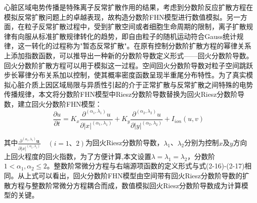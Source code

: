 \documentclass[twoside,UTF8]{nputhesis}
\begin{document}
心脏区域电势传播是特殊离子反常扩散作用的结果，考虑到分数阶反应扩散方程在模拟反常扩散问题上的卓越表现，故构造分数阶FHN模型进行数值模拟。另一方面，在粒子反常扩散过程中，受到扩散空间或者细胞生命周期的限制，离子扩散规律有向服从标准扩散规律转化的趋势，即自由粒子的随机运动符合Gauss统计规律，这一转化的过程称为"暂态反常扩散"。在原有控制分数阶扩散方程的幂律关系上添加指数函数，可以推导出一种新的分数阶导数定义形式——回火分数阶导数。回火分数阶扩散方程可以用于模拟这一过程。空间回火分数阶导数对粒子空间跳跃步长幂律分布关系加以控制，使其概率密度函数呈现半重尾分布特性。为了真实模拟心脏介质上因区域局限与异质性引起的介于正常扩散与反常扩散之间特殊的电势传播规律，本文将分数阶FHN模型中Riesz分数阶导数替换为回火Riesz分数阶导数，建立回火分数阶FHN模型：
\begin{equation}
\frac{\partial u}{\partial t}={{K}_{x}}\frac{{{\partial }^{({{\alpha }_{1}},{{\lambda }_{1}})}}u}{\partial {{\left| x \right|}^{({{\alpha }_{1}},{{\lambda }_{1}})}}}+{{K}_{y}}\frac{{{\partial }^{({{\alpha }_{2}},{{\lambda }_{2}})}}u}{\partial {{\left| y \right|}^{({{\alpha }_{2}},{{\lambda }_{2}})}}}+{{I}_{ion}}(u,v)
\end{equation}

其中$\frac{{{\partial }^{({{\alpha }_{i}},{{\lambda }_{i}})}}\bm{u}}{\partial {{\left| x \right|}^{({{\alpha }_{i}},{{\lambda }_{i}})}}}\quad(i=   1\text{、}2)$为回火Riesz分数阶导数，${{\lambda }_{1}}$、${{\lambda }_{2}}$分别为控制$x$及$y$方向上回火程度的回火指数，为了方便计算,本文设置$\lambda=\lambda_{1}=\lambda_{2}$，分数阶$1<{{\alpha }_{1}},{{\alpha }_{2}}\le 2$。整数阶常微分方程与右端源项函数的定义形式与式(2-16)-(2-17)相同。从上式可以看出，回火分数阶FHN模型由空间带有回火Riesz分数阶导数的扩散方程与整数阶常微分方程耦合而成，数值模拟回火Riesz分数阶导数成为计算模型的关键。
\end{document}
